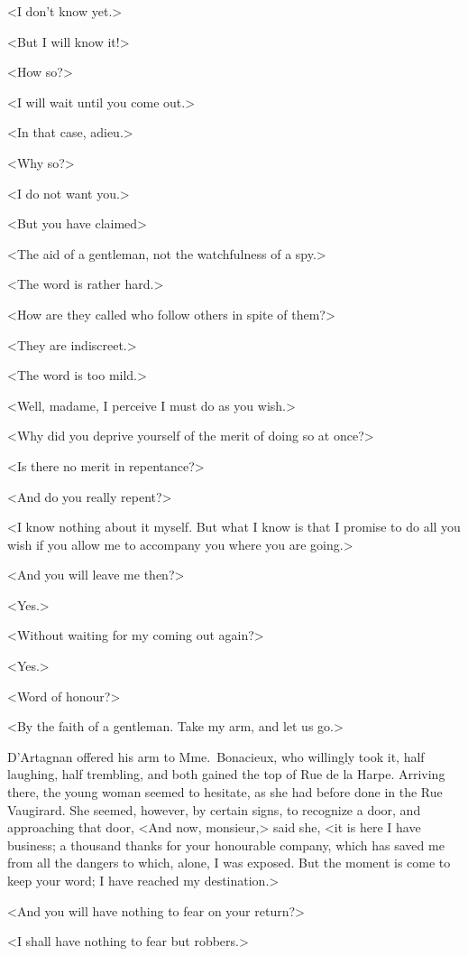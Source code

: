 <I don't know yet.> 

<But I will know it!> 

<How so?> 

<I will wait until you come out.> 

<In that case, adieu.> 

<Why so?> 

<I do not want you.> 

<But you have claimed\longdash> 

<The aid of a gentleman, not the watchfulness of a spy.> 

<The word is rather hard.> 

<How are they called who follow others in spite of them?> 

<They are indiscreet.> 

<The word is too mild.> 

<Well, madame, I perceive I must do as you wish.> 

<Why did you deprive yourself of the merit of doing so at once?> 

<Is there no merit in repentance?> 

<And do you really repent?> 

<I know nothing about it myself. But what I know is that I promise to do all you wish if you allow me to accompany you where you are going.> 

<And you will leave me then?> 

<Yes.> 

<Without waiting for my coming out again?> 

<Yes.> 

<Word of honour?> 

<By the faith of a gentleman. Take my arm, and let us go.> 

D'Artagnan offered his arm to Mme.~Bonacieux, who willingly took it, half laughing, half trembling, and both gained the top of Rue de la Harpe. Arriving there, the young woman seemed to hesitate, as she had before done in the Rue Vaugirard. She seemed, however, by certain signs, to recognize a door, and approaching that door, <And now, monsieur,> said she, <it is here I have business; a thousand thanks for your honourable company, which has saved me from all the dangers to which, alone, I was exposed. But the moment is come to keep your word; I have reached my destination.> 

<And you will have nothing to fear on your return?> 

<I shall have nothing to fear but robbers.> 


